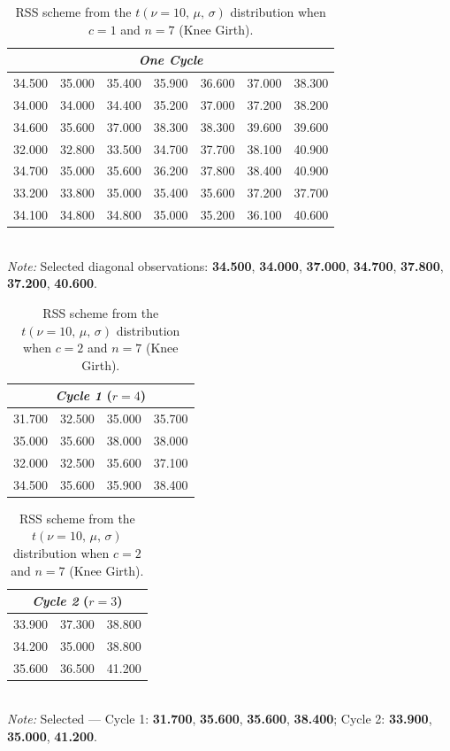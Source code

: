 \documentclass[12pt, a4paper]{article}
\begin{document}
\begin{table}[H]
  \centering
  \caption{RSS scheme from the $t(\nu=10,\,\mu,\,\sigma)$ distribution
           when $c = 1$ and $n = 7$ (Knee Girth).}
  \label{tab:rss_n7}
  \begin{tabular}{ccccccc}
    \toprule
    \multicolumn{7}{c}{\textit{One Cycle}} \\
    \midrule
    34.500 & 35.000 & 35.400 & 35.900 & 36.600 & 37.000 & 38.300 \\
    34.000 & 34.000 & 34.400 & 35.200 & 37.000 & 37.200 & 38.200 \\
    34.600 & 35.600 & 37.000 & 38.300 & 38.300 & 39.600 & 39.600 \\
    32.000 & 32.800 & 33.500 & 34.700 & 37.700 & 38.100 & 40.900 \\
    34.700 & 35.000 & 35.600 & 36.200 & 37.800 & 38.400 & 40.900 \\
    33.200 & 33.800 & 35.000 & 35.400 & 35.600 & 37.200 & 37.700 \\
    34.100 & 34.800 & 34.800 & 35.000 & 35.200 & 36.100 & 40.600 \\
    \bottomrule
  \end{tabular}
  \smallskip\\
  \footnotesize
  \textit{Note:} Selected diagonal observations:
  \textbf{34.500}, \textbf{34.000}, \textbf{37.000}, \textbf{34.700},
  \textbf{37.800}, \textbf{37.200}, \textbf{40.600}.
\end{table}

\begin{table}[H]
  \centering
  \caption{RSS scheme from the $t(\nu=10,\,\mu,\,\sigma)$ distribution
           when $c = 2$ and $n = 7$ (Knee Girth).}
  \label{tab:rss2_n7}
  \begin{tabular}{cccc}
    \toprule
    \multicolumn{4}{c}{\textit{Cycle 1} ($r = 4$)} \\
    \midrule
    31.700 & 32.500 & 35.000 & 35.700 \\
    35.000 & 35.600 & 38.000 & 38.000 \\
    32.000 & 32.500 & 35.600 & 37.100 \\
    34.500 & 35.600 & 35.900 & 38.400 \\
    \bottomrule
  \end{tabular}
  \quad
  \begin{tabular}{ccc}
    \toprule
    \multicolumn{3}{c}{\textit{Cycle 2} ($r = 3$)} \\
    \midrule
    33.900 & 37.300 & 38.800 \\
    34.200 & 35.000 & 38.800 \\
    35.600 & 36.500 & 41.200 \\
    \bottomrule
  \end{tabular}
  \smallskip\\
  \footnotesize
  \textit{Note:} Selected — Cycle 1: \textbf{31.700}, \textbf{35.600},
  \textbf{35.600}, \textbf{38.400}; Cycle 2: \textbf{33.900},
  \textbf{35.000}, \textbf{41.200}.
\end{table}
\end{document}
